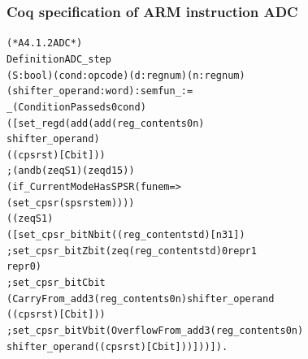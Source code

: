 \documentclass{beamer} %
\begin{document}
\begin{frame}[fragile]
\frametitle{Coq specification of ARM instruction ADC}
\small
\begin{alltt}
(* A4.1.2 ADC *)
Definition ADC_step
    (S : bool) (cond : opcode) (d : regnum) (n : regnum)
    (shifter_operand : word) : semfun _ := 
   _ (ConditionPassed s0 cond)
    ([  set_reg d (add (add (reg_content s0 n)
                                shifter_operand)
                                ((cpsr st)[Cbit]))
    ;  (andb (zeq S 1) (zeq d 15))
           ( if_CurrentModeHasSPSR (fun em =>
              ( set_cpsr (spsr st em))))
\tiny
                     ( (zeq S 1)
                ([  set_cpsr_bit Nbit ((reg_content st d)[n31])
                ;  set_cpsr_bit Zbit ( zeq (reg_content st d) 0  repr 1 
                                           repr 0)
                ;  set_cpsr_bit Cbit
                          (CarryFrom_add3 (reg_content s0 n) shifter_operand
                                          ((cpsr st)[Cbit]))
                ;  set_cpsr_bit Vbit (OverflowFrom_add3 (reg_content s0 n)
                                     shifter_operand ((cpsr st)[Cbit])) ])) ]).
\end{alltt}
\end{frame}
\end{document}
